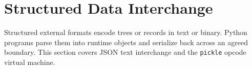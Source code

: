 \section{Structured Data Interchange}

Structured external formats encode trees or records in text or binary. Python programs parse them into runtime objects and serialize back across an agreed boundary. This section covers JSON text interchange and the \texttt{pickle} opcode virtual machine.
